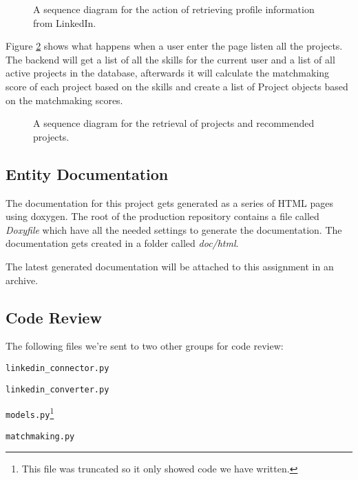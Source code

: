 \begin{figure}[ht]
    \centering
    \scalebox{1}{}
    \caption{A sequence diagram for the action of retrieving profile information from LinkedIn.}
    \label{fig:profilesequence}
\end{figure}

Figure \ref{fig:projectsequence} shows what happens when a user enter the page listen all the projects. The backend will get a list of all the skills for the current user and a list of all active projects in the database, afterwards it will calculate the matchmaking score of each project based on the skills and create a list of Project objects based on the matchmaking scores.

\begin{figure}[ht]
    \centering
    \scalebox{1}{}
    \caption{A sequence diagram for the retrieval of projects and recommended projects.}
    \label{fig:projectsequence}
\end{figure}

\subsection{Entity Documentation}

The documentation for this project gets generated as a series of HTML pages
using doxygen. The root of the production repository contains a file called
\textit{Doxyfile} which have all the needed settings to generate the
documentation. The documentation gets created in a folder called
\textit{doc/html}.

The latest generated documentation will be attached to this assignment in an
archive.

\subsection{Code Review}
The following files we're sent to two other groups for code review:
\begin{itemize*}
    \item \texttt{linkedin\_connector.py}
    \item \texttt{linkedin\_converter.py}
    \item \texttt{models.py}\footnote{This file was truncated so it only showed code we have written.}
    \item \texttt{matchmaking.py}
\end{itemize*}

